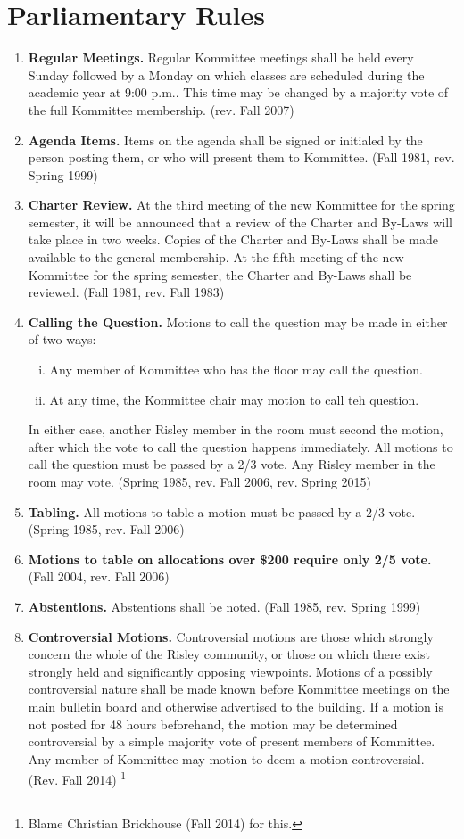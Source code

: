 \documentclass[12pt]{article}
\begin{document}
\section*{Parliamentary Rules}
\begin{enumerate}[1.]
\item \textbf{Regular Meetings.} Regular Kommittee meetings shall be held every Sunday followed by a Monday on which classes are scheduled during the academic year at 9:00 p.m.. This time may be changed by a majority vote of the full Kommittee membership. (rev. Fall 2007)
\item \textbf{Agenda Items.} Items on the agenda shall be signed or initialed by the person posting them, or who will present them to Kommittee. (Fall 1981, rev. Spring 1999)
\item \textbf{Charter Review.} At the third meeting of the new Kommittee for the spring semester, it will be announced that a review of the Charter and By-Laws will take place in two weeks. Copies of the Charter and By-Laws shall be made available to the general membership. At the fifth meeting of the new Kommittee for the spring semester, the Charter and By-Laws shall be reviewed. (Fall 1981, rev. Fall 1983)
\item \textbf{Calling the Question.} Motions to call the question may be made in either of two ways:
\begin{enumerate}[i.]
\item Any member of Kommittee who has the floor may call the question.
\item At any time, the Kommittee chair may motion to call teh question.
\end{enumerate}
In either case, another Risley member in the room must second the motion, after which the vote to call the question happens immediately. All motions to call the question must be passed by a 2/3 vote. Any Risley member in the room may vote. (Spring 1985, rev. Fall 2006, rev. Spring 2015)
\item \textbf{Tabling.} All motions to table a motion must be passed by a 2/3 vote. (Spring 1985, rev. Fall 2006)
\item \textbf{Motions to table on allocations over \$200 require only 2/5 vote.} (Fall 2004, rev. Fall 2006)
\item \textbf{Abstentions.} Abstentions shall be noted. (Fall 1985, rev. Spring 1999)
\item \textbf{Controversial Motions.} Controversial motions are those which strongly concern the whole of the Risley community, or those on which there exist strongly held and significantly opposing viewpoints. Motions of a possibly controversial nature shall be made known before Kommittee meetings on the main bulletin board and otherwise advertised to the building. If a motion is not posted for 48 hours beforehand, the motion may be determined controversial by a simple majority vote of present members of Kommittee. Any member of Kommittee may motion to deem a motion controversial. (Rev. Fall 2014) \footnote{Blame Christian Brickhouse (Fall 2014) for this.}

\end{enumerate}
\end{document}
